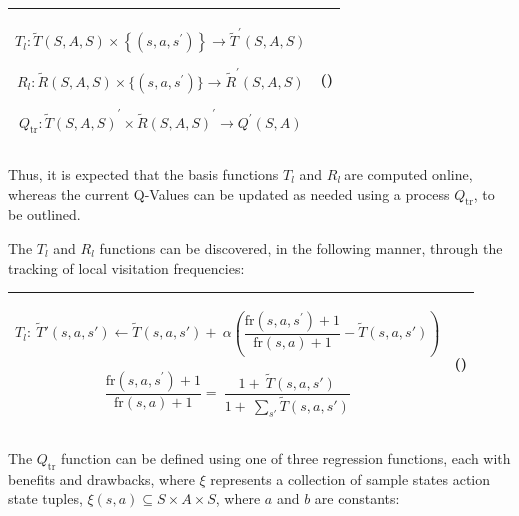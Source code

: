 \documentclass[]{article}
\begin{document}
\begin{longtable}[]{@{}ll@{}}
\toprule
\begin{minipage}[t]{0.48\columnwidth}\raggedright\strut
\[T_{l}:\tilde{T}\left( S,A,S \right) \times \left\{ \left( s,a,s^{'} \right) \right\} \rightarrow {\tilde{T}}^{'}(S,A,S)\]

\[R_{l}:\tilde{R}\left( S,A,S \right) \times \{(s,a,s^{'})\} \rightarrow {\tilde{R}}^{'}(S,A,S)\]

\[Q_{\text{tr}}:{\tilde{T}(S,A,S)}^{'} \times {\tilde{R}(S,A,S)}^{'} \rightarrow Q^{'}(S,A)\]\strut
\end{minipage} & \begin{minipage}[t]{0.48\columnwidth}\raggedright\strut
()\strut
\end{minipage}\tabularnewline
\bottomrule
\end{longtable}

Thus, it is expected that the basis functions \(T_{l}\) and
\(R_{l}\ \)are computed online, whereas the current Q-Values can be
updated as needed using a process \(Q_{\text{tr}}\), to be outlined.

The \(T_{l}\) and \(R_{l}\) functions can be discovered, in the
following manner, through the tracking of local visitation frequencies:

\begin{longtable}[]{@{}ll@{}}
\toprule
\begin{minipage}[t]{0.48\columnwidth}\raggedright\strut
\[T_{l}:\ \tilde{T}'\left( s,a,s' \right) \leftarrow \tilde{T}\left( s,a,s' \right) + \ \alpha\left( \frac{\text{fr}\left( s,a,s^{'} \right) + 1}{\text{fr}\left( s,a \right) + 1} - \tilde{T}\left( s,a,s' \right) \right)\]

\[\frac{\text{fr}\left( s,a,s^{'} \right) + 1}{\text{fr}\left( s,a \right) + 1} = \ \frac{1 + \ \tilde{T}\left( s,a,s' \right)}{1 + \ \sum_{s'}^{\ }{\tilde{T}\left( s,a,s' \right)}}\]\strut
\end{minipage} & \begin{minipage}[t]{0.48\columnwidth}\raggedright\strut
()\strut
\end{minipage}\tabularnewline
\bottomrule
\end{longtable}

The \(Q_{\text{tr}}\) function can be defined using one of three
regression functions, each with benefits and drawbacks, where \(\xi\)
represents a collection of sample states action state tuples,
\(\xi\left( s,a \right) \subseteq S \times A \times S\), where \(a\) and
\(b\) are constants:
\end{document}
